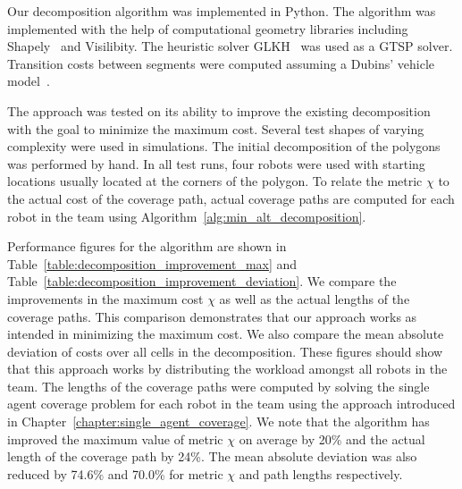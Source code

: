 \documentclass[../main.tex]{subfiles}
\begin{document}
Our decomposition algorithm was implemented in Python. The algorithm was implemented with the help of computational geometry libraries including Shapely~\cite{Shapely:13} and Visilibity\cite{VisiLibity:08}. The heuristic solver GLKH~\cite{helsgaun2000effective} was used as a GTSP solver. Transition costs between segments were computed assuming a Dubins' vehicle model~\cite{dubins1957curves}.

The approach was tested on its ability to improve the existing decomposition with the goal to minimize the maximum cost. Several test shapes of varying complexity were used in simulations. The initial decomposition of the polygons was performed by hand. In all test runs, four robots were used with starting locations usually located at the corners of the polygon. To relate the metric $\chi$ to the actual cost of the coverage path, actual coverage paths are computed for each robot in the team using Algorithm~\ref{alg:min_alt_decomposition}.

Performance figures for the algorithm are shown in Table~\ref{table:decomposition_improvement_max} and Table~\ref{table:decomposition_improvement_deviation}. We compare the improvements in the maximum cost $\chi$ as well as the actual lengths of the coverage paths. This comparison demonstrates that our approach works as intended in minimizing the maximum cost. We also compare the mean absolute deviation of costs over all cells in the decomposition. These figures should show that this approach works by distributing the workload amongst all robots in the team. The lengths of the coverage paths were computed by solving the single agent coverage problem for each robot in the team using the approach introduced in Chapter~\ref{chapter:single_agent_coverage}. We note that the algorithm has improved the maximum value of metric $\chi$ on average by 20\% and the actual length of the coverage path by 24\%. The mean absolute deviation was also reduced by 74.6\% and 70.0\% for metric $\chi$ and path lengths respectively.
\end{document}
